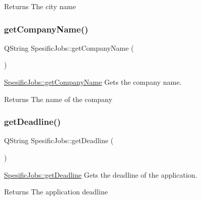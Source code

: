 \begin{DoxyReturn}{Returns}
The city name 
\end{DoxyReturn}
\mbox{\label{class_spesific_jobs_a51afafde9872e78e8b09e3bc00a2a161}} 
\subsubsection{\texorpdfstring{get\+Company\+Name()}{getCompanyName()}}
{\footnotesize\ttfamily Q\+String Spesific\+Jobs\+::get\+Company\+Name (\begin{DoxyParamCaption}{ }\end{DoxyParamCaption})}



\mbox{\hyperlink{class_spesific_jobs_a51afafde9872e78e8b09e3bc00a2a161}{Spesific\+Jobs\+::get\+Company\+Name}} Gets the company name. 

\begin{DoxyReturn}{Returns}
The name of the company 
\end{DoxyReturn}
\mbox{\label{class_spesific_jobs_a4744022c02271fabfb7fca0015896c09}} 
\subsubsection{\texorpdfstring{get\+Deadline()}{getDeadline()}}
{\footnotesize\ttfamily Q\+String Spesific\+Jobs\+::get\+Deadline (\begin{DoxyParamCaption}{ }\end{DoxyParamCaption})}



\mbox{\hyperlink{class_spesific_jobs_a4744022c02271fabfb7fca0015896c09}{Spesific\+Jobs\+::get\+Deadline}} Gets the deadline of the application. 

\begin{DoxyReturn}{Returns}
The application deadline 
\end{DoxyReturn}
\mbox{\label{class_spesific_jobs_afe77ad902d3e9f3cfd5f057e0a37a193}} 

